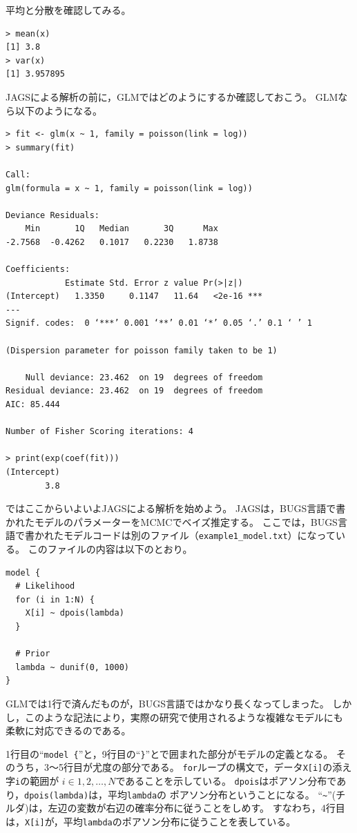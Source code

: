 \documentclass[11pt,uplatex]{jsarticle}
\begin{document}
平均と分散を確認してみる。
\begin{lstlisting}
> mean(x)
[1] 3.8
> var(x)
[1] 3.957895
\end{lstlisting}

\textsf{JAGS}による解析の前に，GLMではどのようにするか確認しておこう。
GLMなら以下のようになる。
\begin{lstlisting}
> fit <- glm(x ~ 1, family = poisson(link = log))
> summary(fit)

Call:
glm(formula = x ~ 1, family = poisson(link = log))

Deviance Residuals: 
    Min       1Q   Median       3Q      Max  
-2.7568  -0.4262   0.1017   0.2230   1.8738  

Coefficients:
            Estimate Std. Error z value Pr(>|z|)    
(Intercept)   1.3350     0.1147   11.64   <2e-16 ***
---
Signif. codes:  0 ‘***’ 0.001 ‘**’ 0.01 ‘*’ 0.05 ‘.’ 0.1 ‘ ’ 1

(Dispersion parameter for poisson family taken to be 1)

    Null deviance: 23.462  on 19  degrees of freedom
Residual deviance: 23.462  on 19  degrees of freedom
AIC: 85.444

Number of Fisher Scoring iterations: 4

> print(exp(coef(fit)))
(Intercept) 
        3.8 
\end{lstlisting}

\vspace{1zw}

ではここからいよいよ\textsf{JAGS}による解析を始めよう。
\textsf{JAGS}は，\textsf{BUGS}言語で書かれたモデルのパラメーターをMCMCでベイズ推定する。
ここでは，\textsf{BUGS}言語で書かれたモデルコードは別のファイル（\texttt{example1\_model.txt}）になっている。
このファイルの内容は以下のとおり。
\begin{lstlisting}
model {
  # Likelihood
  for (i in 1:N) {
    X[i] ~ dpois(lambda)
  }

  # Prior
  lambda ~ dunif(0, 1000)
}
\end{lstlisting}
%
GLMでは1行で済んだものが，\textsf{BUGS}言語ではかなり長くなってしまった。
しかし，このような記法により，実際の研究で使用されるような複雑なモデルにも
柔軟に対応できるのである。

1行目の``\texttt{model \{}''と，9行目の``\texttt{\}}''とで囲まれた部分がモデルの定義となる。
そのうち，3〜5行目が尤度の部分である。
\texttt{for}ループの構文で，データ\texttt{X[i]}の添え字\texttt{i}の範囲が
$i \in 1, 2, \dots, N$であることを示している。
\texttt{dpois}はポアソン分布であり，\texttt{dpois(lambda)}は，平均\texttt{lambda}の
ポアソン分布ということになる。
``\texttt{\textasciitilde}''(チルダ)は，左辺の変数が右辺の確率分布に従うことをしめす。
すなわち，4行目は，\texttt{X[i]}が，平均\texttt{lambda}のポアソン分布に従うことを表している。
\end{document}
